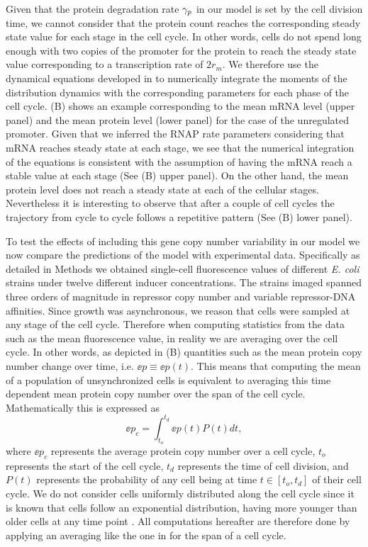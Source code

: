 Given that the protein degradation rate $\gamma _p$ in our model is set by the cell
division time, we cannot consider that the protein count reaches the
corresponding steady state value for each stage in the cell cycle. In other
words, cells do not spend long enough with two copies of the promoter for the
protein to reach the steady state value corresponding to a transcription rate of
$2 r_m$. We therefore use the dynamical equations developed in
 to numerically integrate the moments of the distribution
dynamics with the corresponding parameters for each phase of the cell cycle.
(B) shows an example corresponding to the mean mRNA level
(upper panel) and the mean protein level (lower panel) for the case of the
unregulated promoter. Given that we inferred the RNAP rate parameters
considering that mRNA reaches steady state at each stage, we see that the
numerical integration of the equations is consistent with the assumption of
having the mRNA reach a stable value at each stage (See
(B) upper panel). On the other hand, the mean protein
level does not reach a steady state at each of the cellular stages. Nevertheless
it is interesting to observe that after a couple of cell cycles the trajectory
from cycle to cycle follows a repetitive pattern (See (B)
lower panel).

To test the effects of including this gene copy number variability in our model
we now compare the predictions of the model with experimental data. Specifically
as detailed in Methods we obtained single-cell fluorescence values of
different {\it E. coli} strains under twelve different inducer concentrations.
The strains imaged spanned three orders of magnitude in repressor copy number
and variable repressor-DNA affinities. Since growth was asynchronous, we reason
that cells were sampled at any stage of the cell cycle. Therefore when computing
statistics from the data such as the mean fluorescence value, in reality we are
averaging over the cell cycle. In other words, as depicted in
(B) quantities such as the mean protein copy number change
over time, i.e. $\ee{p} \equiv \ee{p(t)}$. This means that computing the mean of
a population of unsynchronized cells is equivalent to averaging this time
dependent mean protein copy number over the span of the cell cycle.
Mathematically this is expressed as
\begin{equation}
	\ee{p}_c = \int_{t_o}^{t_d} \ee{p(t)} P(t) dt,
	\label{eq_time_avg}
\end{equation}
where $\ee{p}_c$ represents the average protein copy number over a cell cycle,
$t_o$ represents the start of the cell cycle, $t_d$ represents the time of cell
division, and $P(t)$ represents the probability of any cell being at time $t \in
[t_o, t_d]$ of their cell cycle. We do not consider cells uniformly distributed
along the cell cycle since it is known that cells follow an exponential
distribution, having more younger than older cells at any time point
\cite{Powell1956}. All computations hereafter are therefore done by applying an
averaging like the one in  for the span of a cell cycle.

